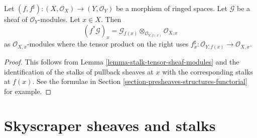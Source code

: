 \begin{lemma}
\label{lemma-stalk-pullback-modules}
Let $(f, f^\sharp) : (X, \mathcal{O}_X) \to (Y, \mathcal{O}_Y)$
be a morphism of ringed spaces.
Let $\mathcal{G}$ be a sheaf of $\mathcal{O}_Y$-modules.
Let $x \in X$. Then
$$
(f^*\mathcal{G})_x =
\mathcal{G}_{f(x)}
\otimes_{\mathcal{O}_{Y, f(x)}}
\mathcal{O}_{X, x}
$$
as $\mathcal{O}_{X, x}$-modules where the tensor product on the right
uses $f^\sharp_x : \mathcal{O}_{Y, f(x)} \to \mathcal{O}_{X, x}$.
\end{lemma}

\begin{proof}
This follows from Lemma \ref{lemma-stalk-tensor-sheaf-modules}
and the identification of the stalks of pullback sheaves
at $x$ with the corresponding stalks at $f(x)$. See the
formulae in Section \ref{section-presheaves-structures-functorial}
for example.
\end{proof}



\section{Skyscraper sheaves and stalks}
\label{section-skyscraper-sheaves}

